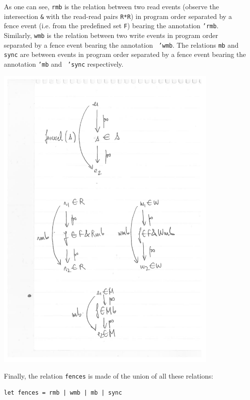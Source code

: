 \documentclass[a4paper]{article}
\begin{document}
As one can see, {\tt rmb} is the relation between two read events (observe the
intersection {\tt \&} with the read-read pairs {\tt R*R}) in program order
separated by a fence event (i.e. from the predefined set {\tt F}) bearing the
annotation {\tt 'rmb}. Similarly, {\tt wmb} is the relation between two write
events in program order separated by a fence event bearing the annotation {\tt
'wmb}. The relations {\tt mb} and {\tt sync} are between events in program
order separated by a fence event bearing the annotation {\tt 'mb} and {\tt
'sync} respectively. 

\includegraphics[width=11cm]{fencerel}

\pagebreak
Finally, the relation {\tt fences} is made of the union of
all these relations:
\begin{verbatim}
let fences = rmb | wmb | mb | sync
\end{verbatim}
\end{document}
